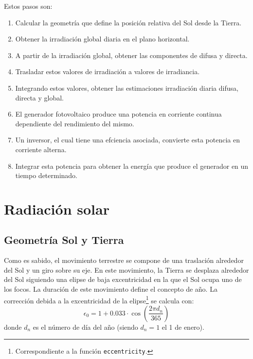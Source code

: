 Estos pasos son:
\begin{enumerate}
\item Calcular la geometría que define la posición relativa del Sol desde la Tierra.
\item Obtener la irradiación global diaria en el plano horizontal.
\item A partir de la irradiación global, obtener las componentes de difusa y directa.
\item Trasladar estos valores de irradiación a valores de irradiancia.
\item Integrando estos valores, obtener las estimaciones irradiación diaria difusa, directa y global.
\item El generador fotovoltaico produce una potencia en corriente continua dependiente del rendimiento del mismo.
\item Un inversor, el cual tiene una efciencia asociada, convierte esta potencia en corriente alterna.
\item Integrar esta potencia para obtener la energía que produce el generador en un tiempo determinado.
\end{enumerate}


\section{Radiación solar}
\label{sec:orge5c8683}
\label{radiacion-solar}
\subsection{Geometría Sol y Tierra}
\label{sec:orgefe3885}
Como es sabido, el movimiento terrestre se compone de una traslación alrededor del Sol y un giro sobre su eje. En este movimiento, la Tierra se desplaza alrededor del Sol siguiendo una elipse de baja excentricidad en la que el Sol ocupa uno de los focos. La duración de este movimiento define el concepto de año. La corrección debida a la excentricidad de la elipse\footnote{Correspondiente a la función \texttt{eccentricity}.} se calcula con: 
\begin{equation}
\epsilon_0=1+0.033\cdot \cos(\frac{2\pi d_n}{365})
\end{equation}
donde \(d_n\) es el número de día del año (siendo \(d_n=1\) el 1 de enero). 

